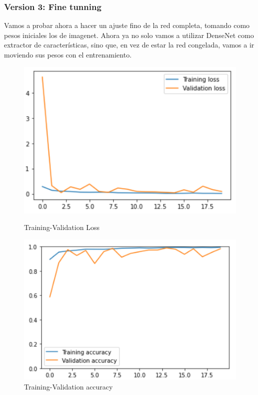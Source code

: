 \documentclass[11pt,a4paper]{article}
\theoremstyle{definition}
\begin{document}
\subsubsection{Version 3: Fine tunning}

Vamos a probar ahora a hacer un ajuste fino de la red completa, tomando como pesos iniciales los de imagenet. Ahora ya no solo vamos a utilizar DenseNet como extractor de características, sino que, en vez de estar la red congelada, vamos a ir moviendo sus pesos con el entrenamiento.

\begin{figure}[H]
  \centering
  \begin{minipage}[b]{0.45\textwidth}
    \includegraphics[scale=0.75]{./images/v3loss}
	\caption{Training-Validation Loss}
  \end{minipage}
  \hfill
  \begin{minipage}[b]{0.45\textwidth}
    \includegraphics[scale=0.75]{./images/v3acc}
	\caption{Training-Validation accuracy}
  \end{minipage}
\end{figure}
\end{document}
